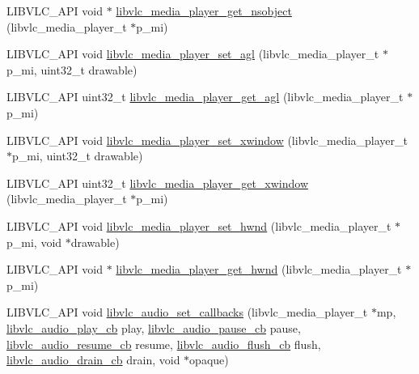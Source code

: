 \begin{DoxyCompactItemize}
\item 
L\+I\+B\+V\+L\+C\+\_\+\+A\+PI void $\ast$ \hyperlink{group__libvlc__media__player_gac331dd7523df7c754d6ce4bb3cdb7e08}{libvlc\+\_\+media\+\_\+player\+\_\+get\+\_\+nsobject} (libvlc\+\_\+media\+\_\+player\+\_\+t $\ast$p\+\_\+mi)
\item 
L\+I\+B\+V\+L\+C\+\_\+\+A\+PI void \hyperlink{group__libvlc__media__player_gadc35c9afb5789c16fbe8e1f358ec141b}{libvlc\+\_\+media\+\_\+player\+\_\+set\+\_\+agl} (libvlc\+\_\+media\+\_\+player\+\_\+t $\ast$p\+\_\+mi, uint32\+\_\+t drawable)
\item 
L\+I\+B\+V\+L\+C\+\_\+\+A\+PI uint32\+\_\+t \hyperlink{group__libvlc__media__player_ga143905045e1be83d8ae3764d1d589b24}{libvlc\+\_\+media\+\_\+player\+\_\+get\+\_\+agl} (libvlc\+\_\+media\+\_\+player\+\_\+t $\ast$p\+\_\+mi)
\item 
L\+I\+B\+V\+L\+C\+\_\+\+A\+PI void \hyperlink{group__libvlc__media__player_ga31827df3a665a72410cb95695147ba5b}{libvlc\+\_\+media\+\_\+player\+\_\+set\+\_\+xwindow} (libvlc\+\_\+media\+\_\+player\+\_\+t $\ast$p\+\_\+mi, uint32\+\_\+t drawable)
\item 
L\+I\+B\+V\+L\+C\+\_\+\+A\+PI uint32\+\_\+t \hyperlink{group__libvlc__media__player_gac0ccdaeef127b62ce26adfa195f0bba1}{libvlc\+\_\+media\+\_\+player\+\_\+get\+\_\+xwindow} (libvlc\+\_\+media\+\_\+player\+\_\+t $\ast$p\+\_\+mi)
\item 
L\+I\+B\+V\+L\+C\+\_\+\+A\+PI void \hyperlink{group__libvlc__media__player_ga0ee3abb85cd9735fdeace4882eb711f3}{libvlc\+\_\+media\+\_\+player\+\_\+set\+\_\+hwnd} (libvlc\+\_\+media\+\_\+player\+\_\+t $\ast$p\+\_\+mi, void $\ast$drawable)
\item 
L\+I\+B\+V\+L\+C\+\_\+\+A\+PI void $\ast$ \hyperlink{group__libvlc__media__player_ga9543ef07c220ccaf6250c2c3022efb46}{libvlc\+\_\+media\+\_\+player\+\_\+get\+\_\+hwnd} (libvlc\+\_\+media\+\_\+player\+\_\+t $\ast$p\+\_\+mi)
\item 
L\+I\+B\+V\+L\+C\+\_\+\+A\+PI void \hyperlink{group__libvlc__media__player_gaac7abb1d8be3f60bb9da20c000703790}{libvlc\+\_\+audio\+\_\+set\+\_\+callbacks} (libvlc\+\_\+media\+\_\+player\+\_\+t $\ast$mp, \hyperlink{group__libvlc__media__player_ga9a242251d11378ecdc43b8ef0cc0254e}{libvlc\+\_\+audio\+\_\+play\+\_\+cb} play, \hyperlink{group__libvlc__media__player_gaac6c92b1a3d331c73fbbba11140fca4e}{libvlc\+\_\+audio\+\_\+pause\+\_\+cb} pause, \hyperlink{group__libvlc__media__player_ga4c61b5ee287be1aa176882cef004e4ca}{libvlc\+\_\+audio\+\_\+resume\+\_\+cb} resume, \hyperlink{group__libvlc__media__player_ga7ab971890ddbf306331989d60b88c171}{libvlc\+\_\+audio\+\_\+flush\+\_\+cb} flush, \hyperlink{group__libvlc__media__player_gaf25ee69cefcb19ae1a1751b7ba73cf41}{libvlc\+\_\+audio\+\_\+drain\+\_\+cb} drain, void $\ast$opaque)

\end{DoxyCompactItemize}
